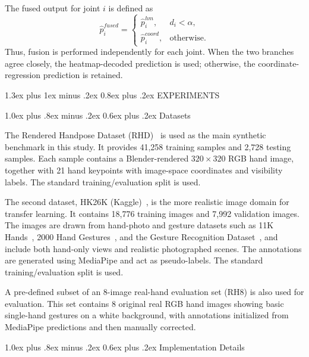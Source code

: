 ﻿\documentclass[10pt,letterpaper]{article}
\makeatletter
\renewcommand\section{\@startsection{section}{1}{\z@}%
  {1.3ex plus 1ex minus .2ex}%
  {0.8ex plus .2ex}%
  {\centering\normalfont\small\scshape}}
\renewcommand\subsection{\@startsection{subsection}{2}{\z@}%
  {1.0ex plus .8ex minus .2ex}%
  {0.6ex plus .2ex}%
  {\normalfont\itshape}}
\makeatother
\begin{document}
The fused output for joint \(i\) is defined as
\begin{equation}
\hat{p}^{fused}_i =
\begin{cases}
\hat{p}^{hm}_i, & d_i < \alpha, \\
\hat{p}^{coord}_i, & \text{otherwise.}
\end{cases}
\label{eq:fused-output}
\end{equation}
Thus, fusion is performed independently for each joint. When the two branches agree closely, the heatmap-decoded prediction is used; otherwise, the coordinate-regression prediction is retained.

\section{EXPERIMENTS}

\subsection{Datasets}

The Rendered Handpose Dataset (RHD)~\cite{rhd} is used as the main synthetic benchmark in this study. It provides 41,258 training samples and 2,728 testing samples. Each sample contains a Blender-rendered $320 \times 320$ RGB hand image, together with 21 hand keypoints with image-space coordinates and visibility labels. The standard training/evaluation split is used.

The second dataset, HK26K (Kaggle)~\cite{hk26k}, is the more realistic image domain for transfer learning. It contains 18,776 training images and 7,992 validation images. The images are drawn from hand-photo and gesture datasets such as 11K Hands~\cite{hands11k}, 2000 Hand Gestures~\cite{giridhar_hand_gestures}, and the Gesture Recognition Dataset~\cite{gesture_recognition_kaggle}, and include both hand-only views and realistic photographed scenes. The annotations are generated using MediaPipe and act as pseudo-labels. The standard training/evaluation split is used.

A pre-defined subset of an 8-image real-hand evaluation set (RH8) is also used for evaluation. This set contains 8 original real RGB hand images showing basic single-hand gestures on a white background, with annotations initialized from MediaPipe predictions and then manually corrected.

\subsection{Implementation Details}
\end{document}
